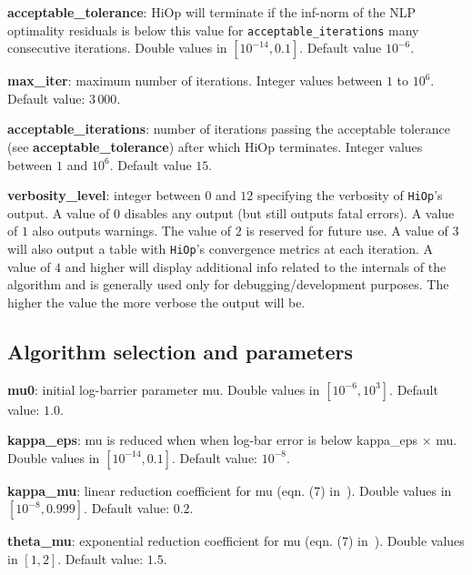 \documentclass[11pt]{article}
\newcounter{line}
\newcommand{\Hi}{\texttt{HiOp}\xspace}
\begin{document}
\medskip

\noindent \textbf{acceptable\_tolerance}: HiOp will terminate if the inf-norm of the NLP optimality residuals is below this value for \texttt{acceptable\_iterations} many consecutive iterations. 
Double values in $[10^{-14},0.1]$. Default value $10^{-6}$.

\medskip

\noindent \textbf{max\_iter}: maximum number of iterations. Integer values between $1$ to $10^6$. Default value: $3\,000$.

\medskip

\noindent \textbf{acceptable\_iterations}: number of iterations passing the acceptable tolerance (see \textbf{acceptable\_tolerance}) after which HiOp terminates. Integer values between $1$ and $10^6$. Default value $15$.

\medskip

\noindent \textbf{verbosity\_level}: integer between $0$ and $12$ specifying the verbosity of \Hi's output. A value of $0$ disables any output (but still outputs fatal errors). A value of $1$ also outputs warnings. The value of $2$ is reserved for future use. A value of $3$ will also output a table with \Hi's convergence metrics at each iteration. A value of $4$ and higher will display additional info related to the internals of the algorithm and is generally used only for debugging/development purposes. The higher the value the more verbose the output will be.

\subsection{Algorithm selection and parameters}

\noindent \textbf{mu0}: initial log-barrier parameter mu. Double values in $[10^{-6},10^3]$. Default value: $1.0$. 

\medskip


\noindent \textbf{kappa\_eps}: mu is reduced when when log-bar error is below kappa\_eps $\times$ mu. Double values in $[10^{-14},0.1]$. Default value: $10^{-8}$. 

\medskip


\noindent \textbf{kappa\_mu}: linear reduction coefficient for mu (eqn. (7) in~\cite{waecther_05_ipopt0}). Double values in $[10^{-8},0.999]$. Default value: $0.2$.  

\medskip


\noindent \textbf{theta\_mu}: exponential reduction coefficient for mu (eqn. (7) in~\cite{waecther_05_ipopt0}). Double values in $[1, 2]$. Default value: $1.5$.
\end{document}
